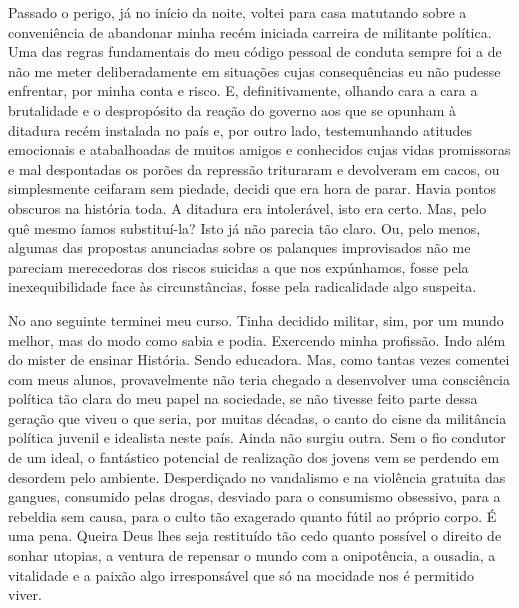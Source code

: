 Passado o perigo, já no início da noite, voltei para casa matutando sobre a conveniência de abandonar minha recém iniciada carreira de militante política.
Uma das regras fundamentais do meu código pessoal de conduta sempre foi a de não me meter deliberadamente em situações cujas consequências eu não pudesse enfrentar, por minha conta e risco.
E, definitivamente, olhando cara a cara a brutalidade e o despropósito da reação do governo aos que se opunham à ditadura recém instalada no país e, por outro lado, testemunhando atitudes emocionais e atabalhoadas de muitos amigos e conhecidos cujas vidas promissoras e mal despontadas os porões da repressão trituraram e devolveram em cacos, ou simplesmente ceifaram sem piedade, decidi que era hora de parar.
Havia pontos obscuros na história toda.
A ditadura era intolerável, isto era certo.
Mas, pelo quê mesmo íamos substituí-la?  Isto já não parecia tão claro.
Ou, pelo menos, algumas das propostas anunciadas sobre os palanques improvisados não me pareciam merecedoras dos riscos suicidas a que nos expúnhamos, fosse pela inexequibilidade face às circunstâncias, fosse pela radicalidade algo suspeita.


No ano seguinte terminei meu curso.
Tinha decidido militar, sim, por um mundo melhor, mas do modo como sabia e podia.
Exercendo minha profissão.
Indo além do mister de ensinar História.
Sendo educadora.
Mas, como tantas vezes comentei com meus alunos, provavelmente não teria chegado a desenvolver uma consciência política tão clara do meu papel na sociedade, se não tivesse feito parte dessa geração que viveu o que seria, por muitas décadas, o canto do cisne da militância política juvenil e idealista neste país.
 Ainda não surgiu outra.
Sem o fio condutor de um ideal, o fantástico potencial de realização dos jovens vem se perdendo em desordem pelo ambiente.
Desperdiçado no vandalismo e na violência gratuita das gangues, consumido pelas drogas, desviado para o consumismo obsessivo, para a rebeldia sem causa, para o culto tão exagerado quanto fútil ao próprio corpo.
É uma pena.
Queira Deus lhes seja restituído tão cedo quanto possível o direito de sonhar utopias, a ventura de repensar o mundo com a onipotência, a ousadia, a vitalidade e a paixão algo irresponsável que só na mocidade nos é permitido viver.

